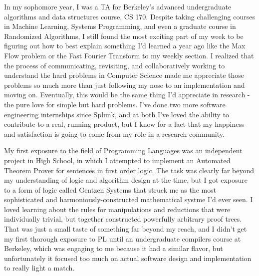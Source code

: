 \documentclass{nsf-grfp}
\begin{document}
In my sophomore year, I was a TA for Berkeley's advanced undergraduate algorithms and data structures course, CS 170. Despite taking challenging courses in Machine Learning, Systems Programming, and even a graduate course in Randomized Algorithms, I still found the most exciting part of my week to be figuring out how to best explain something I'd learned a year ago like the Max Flow problem or the Fast Fourier Transform to my weekly section. I realized that the process of communicating, revisiting, and collaboratively working to understand the hard problems in Computer Science made me appreciate those problems so much more than just following my nose to an implementation and moving on. Eventually, this would be the same thing I'd appreciate in research - the pure love for simple but hard problems. I've done two more software engineering internships since Splunk, and at both I've loved the ability to contribute to a real, running product, but I know for a fact that my happiness and satisfaction is going to come from my role in a research community.

My first exposure to the field of Programming Languages was an independent project in High School, in which I attempted to implement an Automated Theorem Prover for sentences in first order logic. The task was clearly far beyond my understanding of logic and algorithm design at the time, but I got exposure to a form of logic called Gentzen Systems that struck me as the most sophisticated and harmoniously-constructed mathematical systme I'd ever seen. I loved learning about the rules for manipulations and reductions that were individually trivial, but together constructed powerfully arbitrary proof trees. That was just a small taste of something far beyond my reach, and I didn't get my first thorough exposure to PL until an undergraduate compilers course at Berkeley, which was engaging to me because it had a similar flavor, but unfortunately it focused too much on actual software design and implementation to really light a match. 
\end{document}

